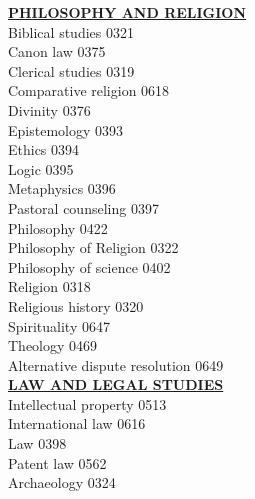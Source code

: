 \documentclass[9pt,twoside]{article}
\newcommand{\categoryheading}[1]{{\fontsize{8}{11}\selectfont \textbf{\uline{#1}}}}
\begin{document}
\begin{multicols}{3}
\categoryheading{PHILOSOPHY AND RELIGION} \leavevmode \\
Biblical studies \hfill 0321 \leavevmode \\
Canon law \hfill 0375 \leavevmode \\
Clerical studies \hfill 0319 \leavevmode \\
Comparative religion \hfill 0618 \leavevmode \\
Divinity \hfill 0376 \leavevmode \\
Epistemology \hfill 0393 \leavevmode \\
Ethics \hfill 0394 \leavevmode \\
Logic \hfill 0395 \leavevmode \\
Metaphysics \hfill 0396 \leavevmode \\
Pastoral counseling \hfill 0397 \leavevmode \\
Philosophy \hfill 0422 \leavevmode \\
Philosophy of Religion \hfill 0322 \leavevmode \\
Philosophy of science \hfill 0402 \leavevmode \\
Religion \hfill 0318 \leavevmode \\
Religious history \hfill 0320 \leavevmode \\
Spirituality \hfill 0647 \leavevmode \\
Theology \hfill 0469 \leavevmode \\
Alternative dispute resolution \hfill 0649 \leavevmode \\
\columnbreak
\categoryheading{LAW AND LEGAL STUDIES} \leavevmode \\
Intellectual property \hfill 0513 \leavevmode \\
International law \hfill 0616 \leavevmode \\
Law \hfill 0398 \leavevmode \\
Patent law \hfill 0562 \leavevmode \\
Archaeology \hfill 0324


\end{multicols}
\end{document}
